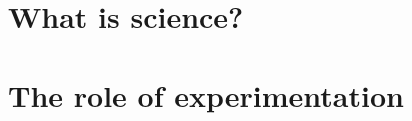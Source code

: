 \part{What is science?}
\frame{\partpage}

{

}

\part{The role of experimentation}
\frame{\partpage}

{

}
